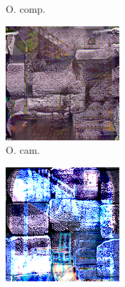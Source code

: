 \begin{figure}[]
\begin{subfigure}{\textwidth}
\begin{subfigure}{0.19\textwidth}
            \caption{O. comp.}
            \label{fig:ex03-staircase_illum-beams-stats_im}
        \end{subfigure}
        \hfill
        \begin{subfigure}{0.19\textwidth}
            \centering
            \includegraphics[width=\textwidth]{images/04-experiment03/staircase_illum/beams/stats_proj.jpg}
            \caption{O. cam.}
            \label{fig:ex03-staircase_illum-beams-stats_proj}
        \end{subfigure}
        \hfill
        \begin{subfigure}{0.19\textwidth}
            \centering
            \includegraphics[width=\textwidth]{images/04-experiment03/staircase_illum/beams/pixel_im.jpg}

\end{subfigure}
\end{subfigure}
\end{figure}
